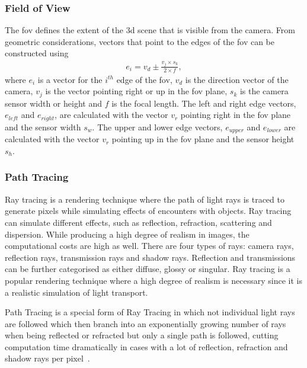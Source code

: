 \subsubsection{Field of View}
The \gls{fov} defines the extent of the \gls{3d} scene that is visible from the camera. From geometric considerations, vectors that point to the edges of the \gls{fov} can be constructed using
\begin{align}
    e_{i} = v_d \pm \frac{v_j \times s_k}{2 \times f}, \label{eq:fov_edge}
\end{align}
where $e_{i}$ is a vector for the $i^{th}$ edge of the \gls{fov}, $v_d$ is the direction vector of the camera, $v_j$ is the vector pointing right or up in the \gls{fov} plane, $s_k$ is the camera sensor width or height and $f$ is the focal length. The left and right edge vectors, $e_{left}$ and $e_{right}$, are calculated with the vector $v_r$ pointing right in the \gls{fov} plane and the sensor width $s_w$. The upper and lower edge vectors, $e_{upper}$ and $e_{lower}$  are calculated with the vector $v_r$ pointing up in the \gls{fov} plane and the sensor height $s_h$.

\subsubsection{Path Tracing}
Ray tracing is a rendering technique where the path of light rays is traced to generate pixels while simulating effects of encounters with objects. Ray tracing can simulate different effects, such as reflection, refraction, scattering and dispersion. While producing a high degree of realism in images, the computational costs are high as well. There are four types of rays: camera rays, reflection rays, transmission rays and shadow rays. Reflection and transmissions can be further categorised as either diffuse, glossy or singular. Ray tracing is a popular rendering technique where a high degree of realism is necessary since it is a realistic simulation of light transport.

Path Tracing is a special form of Ray Tracing in which not individual light rays are followed which then branch into an exponentially growing number of rays when being reflected or refracted but only a single path is followed, cutting computation time dramatically in cases with a lot of reflection, refraction and shadow rays per pixel~\cite{Kajiya1986TheEquation}.

